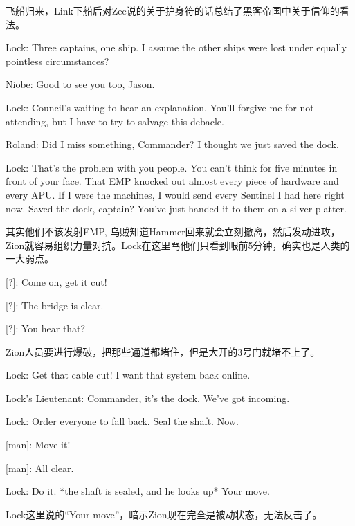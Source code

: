 \documentclass[UTF8]{ctexart}
\newenvironment{myquote}{\color{green} \setlength{\leftskip}{6em} \setlength{\rightskip}{4em} \setlength{\parindent}{-2em}}{\par}
\begin{document}
飞船归来，Link下船后对Zee说的关于护身符的话总结了黑客帝国中关于信仰的看法。

\begin{myquote}
Lock: Three captains, one ship. I assume the other ships were lost under equally pointless circumstances?

Niobe: Good to see you too, Jason.

Lock: Council's waiting to hear an explanation. You'll forgive me for not attending, but I have to try to salvage this debacle.

Roland: Did I miss something, Commander? I thought we just saved the dock.

Lock: That's the problem with you people. You can't think for five minutes in front of your face. That EMP knocked out almost every piece of hardware and every APU. If I were the machines, I would send every Sentinel I had here right now. Saved the dock, captain? You've just handed it to them on a silver platter.
\end{myquote}

其实他们不该发射EMP, 乌贼知道Hammer回来就会立刻撤离，然后发动进攻，Zion就容易组织力量对抗。Lock在这里骂他们只看到眼前5分钟，确实也是人类的一大弱点。

\begin{myquote}
[?]: Come on, get it cut!

[?]: The bridge is clear.

[?]: You hear that?
\end{myquote}

Zion人员要进行爆破，把那些通道都堵住，但是大开的3号门就堵不上了。

\begin{myquote}
Lock: Get that cable cut! I want that system back online.

Lock's Lieutenant: Commander, it's the dock. We've got incoming.

Lock: Order everyone to fall back. Seal the shaft. Now.

[man]: Move it!

[man]: All clear.

Lock: Do it. *the shaft is sealed, and he looks up* Your move.
\end{myquote}

Lock这里说的“Your move”，暗示Zion现在完全是被动状态，无法反击了。
\end{document}
